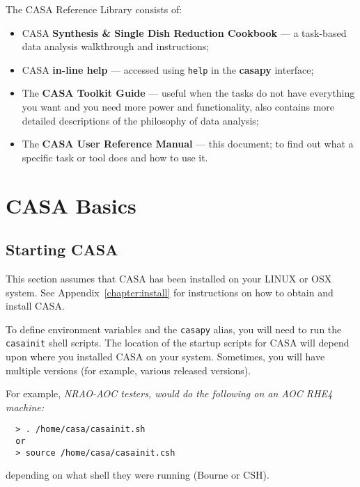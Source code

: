 The CASA Reference Library consists of:
\begin{itemize}
   \item CASA {\bf Synthesis \& Single Dish Reduction Cookbook} ---
     a task-based data analysis walkthrough and instructions;
   \item CASA {\bf in-line help} --- accessed using {\tt help} in the 
              {\bf casapy} interface;
   \item The {\bf CASA Toolkit Guide} --- useful when the 
         tasks do not have everything you want and you need more power
         and functionality, also contains more detailed descriptions
         of the philosophy of data analysis;
   \item The {\bf CASA User Reference Manual} --- this document; 
         to find out what a specific task or tool does and how to use it.   
\end{itemize}



\section{CASA Basics}
\label{section:intro.basics}

\subsection{Starting CASA}
\label{section:intro.basics.starting}

This section assumes that CASA has been installed on your LINUX or OSX
system.  See Appendix~\ref{chapter:install} for instructions on how to 
obtain and install CASA.  

To define environment variables and the {\tt casapy} alias, you will
need to run the {\tt casainit} shell scripts.
The location of the startup scripts for CASA will depend upon where
you installed CASA on your system.  Sometimes, you will have multiple
versions (for example, various released versions).

For example, {\it NRAO-AOC testers, would do the following on an AOC RHE4
machine:}
\small
\begin{verbatim}
  > . /home/casa/casainit.sh
  or
  > source /home/casa/casainit.csh
\end{verbatim}
\normalsize
depending on what shell they were running (Bourne or CSH).

